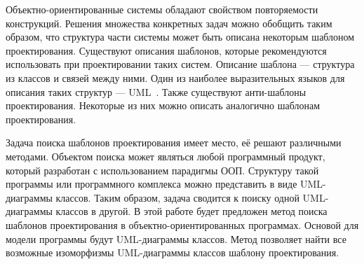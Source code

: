 \Introduction

Объектно-ориентированные системы обладают свойством повторяемости конструкций.
Решения множества конкретных задач можно обобщить таким образом,
что структура части системы может быть описана некоторым шаблоном проектирования.
Существуют описания шаблонов, которые рекомендуются использовать при
проектировании таких систем.
Описание шаблона --- структура из классов и связей между ними.
Один из наиболее выразительных языков для описания таких структур ---
UML~\cite{UMLSuperstructure}.
Также существуют анти-шаблоны проектирования.
Некоторые из них можно описать аналогично шаблонам проектирования.

Задача поиска шаблонов проектирования имеет место, её решают различными методами.
Объектом поиска может являться любой программный продукт, который разработан с
использованием парадигмы ООП.
Структуру такой программы или программного комплекса можно представить в виде
UML-диаграммы классов.
Таким образом, задача сводится к поиску одной UML-диаграммы классов в другой.
В этой работе будет предложен метод поиска шаблонов проектирования в
объектно-ориентированных программах.
Основой для модели программы будут UML-диаграммы классов.
Метод позволяет найти все возможные изоморфизмы UML-диаграммы классов шаблону
проектирования.
